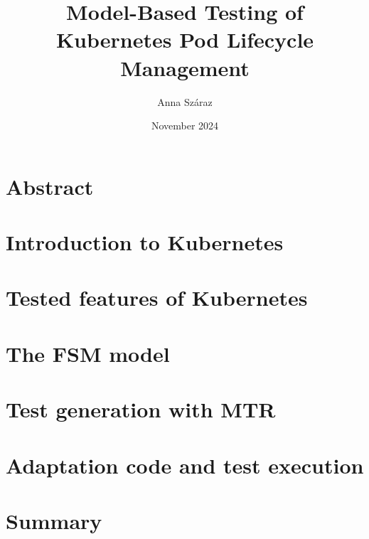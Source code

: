 \documentclass{article}
\title{Model-Based Testing of Kubernetes Pod Lifecycle Management
}
\author{Anna Száraz}
\date{November 2024}
\begin{document}
\maketitle

\section*{Abstract}


\pagebreak
\tableofcontents
\pagebreak

\section{Introduction to Kubernetes}


\pagebreak

\section{Tested features of Kubernetes}


\pagebreak

\section{The FSM model}


\pagebreak

\section{Test generation with MTR}


\pagebreak

\section{Adaptation code and test execution}


\pagebreak

\section{Summary}


\pagebreak

\printbibliography
\end{document}
